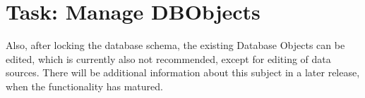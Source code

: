 \section{Task: Manage DBObjects}
\label{sec:manage_dbobjects}

Also, after locking the database schema, the existing Database Objects can be edited, which is currently also not recommended, except for editing of data sources. There will be additional information about this subject in a later release, when the functionality has matured.
 
